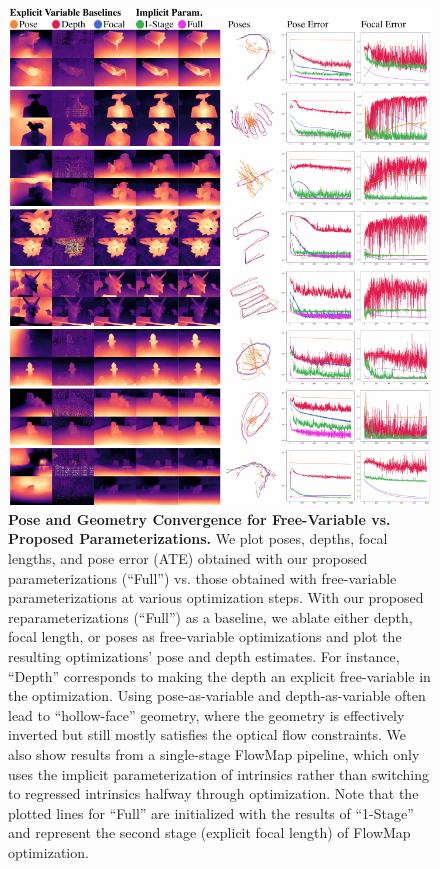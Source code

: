\begin{figure}[!]
    \centering
    \includegraphics[width=\linewidth,]{figures/pdfs/source_matrix_large_compressed.pdf}
    \caption{\textbf{Pose and Geometry Convergence for Free-Variable vs. Proposed Parameterizations.}
    We plot poses, depths, focal lengths, and pose error (ATE) obtained with our proposed parameterizations (``Full'') vs. those obtained with free-variable parameterizations at various optimization steps. With our proposed reparameterizations (``Full'') as a baseline, we ablate either depth, focal length, or poses as free-variable optimizations and plot the resulting optimizations' pose and depth estimates. For instance, ``Depth'' corresponds to making the depth an explicit free-variable in the optimization. Using pose-as-variable and depth-as-variable often lead to ``hollow-face'' geometry, where the geometry is effectively inverted but still mostly satisfies the optical flow constraints. We also show results from a single-stage FlowMap pipeline, which only uses the implicit parameterization of intrinsics rather than switching to regressed intrinsics halfway through optimization. Note that the plotted lines for ``Full'' are initialized with the results of ``1-Stage'' and represent the second stage (explicit focal length) of FlowMap optimization.}
    \label{fig:convergence}
\end{figure}
